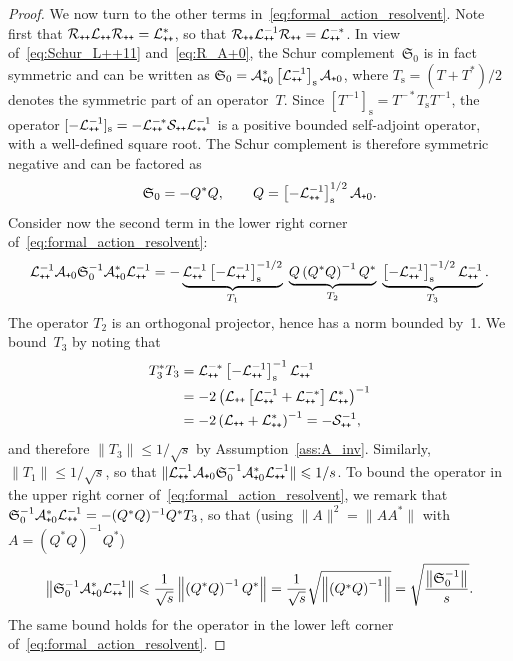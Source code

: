 \documentclass[AHL,Unicode,longabstracts,MathTools,published]{cedram}
\newcommand{\rms}{\mathrm{s}}
\newcommand{\cL}{\mathcal{L}}
\newcommand{\cLs}{\mathcal{S}}
\newcommand{\cLa}{\mathcal{A}}
\newcommand{\cR}{\mathcal{R}}
\newcommand{\Schur}{\mathfrak{S}_0}
\newcommand{\subplus}{\textnormal{\texttt{+}}}
\renewcommand{\le}{\leqslant}
\begin{document}
\begin{proof}
We now turn to the other terms in~\eqref{eq:formal_action_resolvent}. Note first that $\cR_{\subplus\subplus} \cL_{\subplus\subplus}
\cR_{\subplus\subplus} = \cL_{\subplus\subplus}^*$, so that $\cR_{\subplus\subplus} \cL_{\subplus\subplus}^{-1}
\cR_{\subplus\subplus} = \cL_{\subplus\subplus}^{-*}$. In view of~\eqref{eq:Schur_L++11} and~\eqref{eq:R_A+0}, the Schur complement~$\Schur$ is in fact symmetric and can be written as $\Schur = \cLa_{\subplus0}^{*} \left[\cL_{\subplus\subplus}^{-1}\right]_{\rms} \cLa_{\subplus0}$, where $T_{{\rms}} = (T + T^{*})/2$ denotes the symmetric part of an operator~$T$. Since $[T^{-1}]_{{\rms}} = T^{-*} T_{{\rms}} T^{-1}$, the operator $[-\cL_{\subplus\subplus}^{-1}]_{\rms} = -\cL_{\subplus\subplus}^{-*}
\cLs_{\subplus\subplus}\cL_{\subplus\subplus}^{-1}$ is a positive bounded self-adjoint operator, with a well-defined square root. The Schur complement is therefore symmetric negative and can be factored as
\[
\Schur = -Q^{*} Q, \qquad Q = \left[-\cL_{\subplus\subplus}^{-1}\right]_{{\rms}}^{1/2} \cLa_{\subplus0}.
\]
Consider now the second term in the lower right corner of~\eqref{eq:formal_action_resolvent}:
\[
\cL_{\subplus\subplus}^{-1} \cLa_{\subplus0} \Schur^{-1} \cLa_{\subplus0}^{*} \cL_{\subplus\subplus}^{-1} = -\underbrace{\cL_{\subplus\subplus}^{-1}\left[-\cL_{\subplus\subplus}^{-1}\right]_{\rms}^{-1/2}}_{T_{1}} \; \underbrace{Q \left(Q^{*}Q\right)^{-1} Q^{*}}_{T_{2}}\; \underbrace{\left[-\cL_{\subplus\subplus}^{-1}\right]_{\rms}^{-1/2}\cL_{\subplus\subplus}^{-1}}_{T_{3}}.
\]
The operator $T_{2}$ is an orthogonal projector, hence has a norm bounded by~1. We bound~$T_{3}$ by noting that
\begin{align*}
T_{3}^{*} T_{3} &= \cL_{\subplus\subplus}^{-*} \left[-\cL_{\subplus\subplus}^{-1}\right]_{\rms}^{-1} \cL_{\subplus\subplus}^{-1}\\
 &= -2\left(\cL_{\subplus\subplus}\left[\cL_{\subplus\subplus}^{-1}+\cL_{\subplus\subplus}^{-*}\right]\cL_{\subplus\subplus}^*\right)^{-1} \\
&= -2\left(\cL_{\subplus\subplus}+\cL_{\subplus\subplus}^*\right)^{-1} = -\cLs_{\subplus\subplus}^{-1},
\end{align*}
and therefore $\|T_{3}\| \le 1/{\sqrt s}$ by Assumption~\ref{ass:A_inv}. Similarly, $\|T_{1}\| \le 1/{\sqrt s}$, so that $\|\cL_{\subplus\subplus}^{-1} \cLa_{\subplus0} \Schur^{-1} \cLa_{\subplus0}^{*} \cL_{\subplus\subplus}^{-1}\| \le 1/s$. To bound the operator in the upper right corner of~\eqref{eq:formal_action_resolvent}, we remark that $\Schur^{-1} \cLa_{\subplus0}^{*} \cL_{\subplus\subplus}^{-1} = -(Q^{*}Q)^{-1} Q^* T_3$, so that (using $\|A\|^2 = \|A A^*\|$ with $A=(Q^{*}Q)^{-1} Q^{*}$)
\[
\left\|\Schur^{-1} \cLa_{\subplus0}^{*} \cL_{\subplus\subplus}^{-1}\right\| \le \frac 1 {\sqrt s} \left\|\left(Q^{*}Q\right)^{-1} Q^*\right\| = \frac 1 {\sqrt s} \sqrt{\left\|\left(Q^{*}Q\right)^{-1}\right\|} = \sqrt{\frac{\left\|\Schur^{-1}\right\|}{s}}.
\]
The same bound holds for the operator in the lower left corner of~\eqref{eq:formal_action_resolvent}.


\end{proof}
\end{document}
